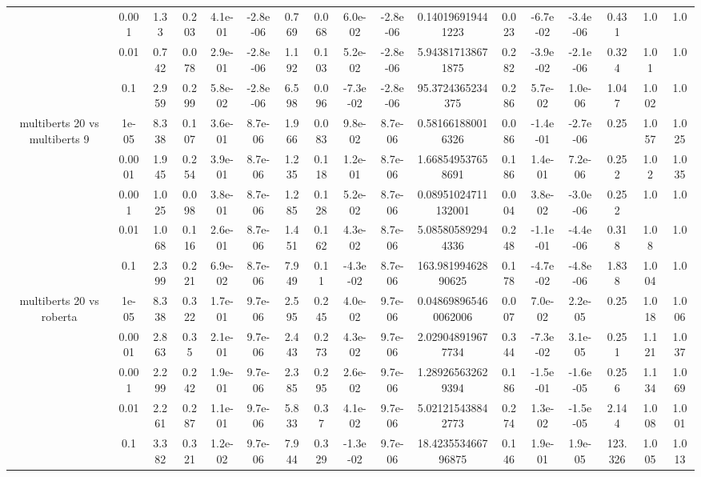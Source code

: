 \begin{tabular}{|c|c|c|c|c|c|c|c|c|c|c|c|c|c|c|c|c|}
 & 0.001 & 1.33 & 0.203 & 4.1e-01 & -2.8e-06 & 0.769 & 0.068 & 6.0e-02 & -2.8e-06 & 0.140196919441223 & 0.023 & -6.7e-02 & -3.4e-06 & 0.431 & 1.0 & 1.0 \\
 & 0.01 & 0.742 & 0.078 & 2.9e-01 & -2.8e-06 & 1.192 & 0.103 & 5.2e-02 & -2.8e-06 & 5.943817138671875 & 0.282 & -3.9e-02 & -2.1e-06 & 0.324 & 1.01 & 1.0 \\
 & 0.1 & 2.959 & 0.299 & 5.8e-02 & -2.8e-06 & 6.598 & 0.096 & -7.3e-02 & -2.8e-06 & 95.3724365234375 & 0.286 & 5.7e-02 & 1.0e-06 & 1.047 & 1.002 & 1.0 \\
\hline
\multirow{5}{*}{multiberts 20 vs multiberts 9} & 1e-05 & 8.338 & 0.107 & 3.6e-01 & 8.7e-06 & 1.966 & 0.083 & 9.8e-02 & 8.7e-06 & 0.581661880016326 & 0.086 & -1.4e-01 & -2.7e-06 & 0.25 & 1.057 & 1.025 \\
 & 0.0001 & 1.945 & 0.254 & 3.9e-01 & 8.7e-06 & 1.235 & 0.118 & 1.2e-01 & 8.7e-06 & 1.668549537658691 & 0.186 & 1.4e-01 & 7.2e-06 & 0.252 & 1.02 & 1.035 \\
 & 0.001 & 1.025 & 0.098 & 3.8e-01 & 8.7e-06 & 1.285 & 0.128 & 5.2e-02 & 8.7e-06 & 0.08951024711132001 & 0.004 & 3.8e-02 & -3.0e-06 & 0.252 & 1.0 & 1.0 \\
 & 0.01 & 1.068 & 0.116 & 2.6e-01 & 8.7e-06 & 1.451 & 0.162 & 4.3e-02 & 8.7e-06 & 5.085805892944336 & 0.248 & -1.1e-01 & -4.4e-06 & 0.318 & 1.08 & 1.0 \\
 & 0.1 & 2.399 & 0.221 & 6.9e-02 & 8.7e-06 & 7.949 & 0.11 & -4.3e-02 & 8.7e-06 & 163.98199462890625 & 0.178 & -4.7e-02 & -4.8e-06 & 1.838 & 1.004 & 1.0 \\
\hline
\multirow{5}{*}{multiberts 20 vs roberta } & 1e-05 & 8.338 & 0.322 & 1.7e-01 & 9.7e-06 & 2.595 & 0.245 & 4.0e-02 & 9.7e-06 & 0.048698965460062006 & 0.007 & 7.0e-02 & 2.2e-05 & 0.25 & 1.018 & 1.006 \\
 & 0.0001 & 2.863 & 0.35 & 2.1e-01 & 9.7e-06 & 2.443 & 0.273 & 4.3e-02 & 9.7e-06 & 2.029048919677734 & 0.344 & -7.3e-02 & 3.1e-05 & 0.251 & 1.121 & 1.037 \\
 & 0.001 & 2.299 & 0.242 & 1.9e-01 & 9.7e-06 & 2.385 & 0.295 & 2.6e-02 & 9.7e-06 & 1.289265632629394 & 0.186 & -1.5e-01 & -1.6e-05 & 0.256 & 1.134 & 1.069 \\
 & 0.01 & 2.261 & 0.287 & 1.1e-01 & 9.7e-06 & 5.833 & 0.37 & 4.1e-02 & 9.7e-06 & 5.021215438842773 & 0.274 & 1.3e-02 & -1.5e-05 & 2.144 & 1.008 & 1.001 \\
 & 0.1 & 3.382 & 0.321 & 1.2e-02 & 9.7e-06 & 7.944 & 0.329 & -1.3e-02 & 9.7e-06 & 18.423553466796875 & 0.146 & 1.9e-01 & 1.9e-05 & 123.326 & 1.005 & 1.013 \\

\end{tabular}
